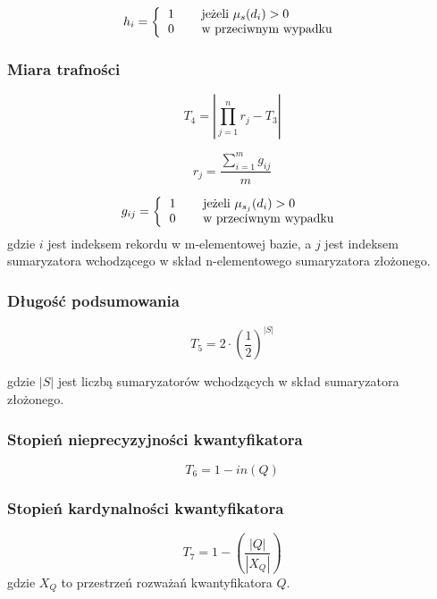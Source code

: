\documentclass{classrep}
\begin{document}
\begin{equation}
h_i = \left\{
\begin{tabular}{l l}
1 & \quad \mbox{jeżeli $\mu_s(d_i) > 0$}\\
 0 & \quad \mbox{w przeciwnym wypadku}\\ 
\end{tabular} \right .
\end{equation}

\subsubsection{Miara trafności}


\begin{equation}
T_4=|\prod_{j=1}^n r_j -T_3|
\end{equation}

\begin{equation}
r_j=\frac{\sum_{i=1}^m g_{ij}}{m}
\end{equation}

\begin{equation}
g_{ij} = \left\{
\begin{tabular}{l l}
1 & \quad \mbox{jeżeli $\mu_{s_j}(d_i) > 0$}\\
 0 & \quad \mbox{w przeciwnym wypadku}\\ 
\end{tabular} \right .
\end{equation}
gdzie $i$ jest indeksem rekordu w m-elementowej bazie, a $j$ jest indeksem sumaryzatora wchodzącego w skład n-elementowego sumaryzatora złożonego.

\subsubsection{Długość podsumowania}
\begin{equation}
T_5=2 \cdot (\frac{1}{2})^{|S|}
\end{equation}

gdzie $|S|$ jest liczbą sumaryzatorów wchodzących w skład sumaryzatora złożonego.

\subsubsection{Stopień nieprecyzyjności kwantyfikatora}
\begin{equation}
T_6=1-in(Q)
\end{equation}

\subsubsection{Stopień kardynalności kwantyfikatora}
\begin{equation}
T_7=1-(\frac{|Q|}{|X_Q|})
\end{equation}
gdzie $X_Q$ to przestrzeń rozważań kwantyfikatora $Q$.
\end{document}
